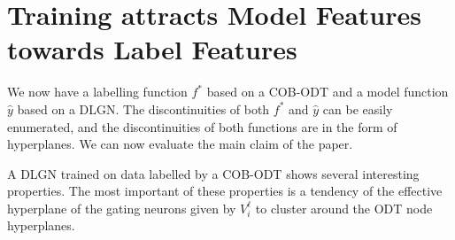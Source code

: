 \documentclass{article} %
\renewcommand{\>}{{\rightarrow}}
\renewcommand{\=}{\stackrel{\triangle}{=}}
\newcommand{\0}{{\mathbf 0}}
\begin{document}

\section{Training attracts Model Features towards Label Features}
\label{sec:Model-feats-label-feats}
We now have a labelling function $f^*$ based on a COB-ODT and a model function $\widehat y$ based on a DLGN. The discontinuities of both $f^*$ and $\widehat y$ can be easily enumerated, and the discontinuities of both functions are in the form of hyperplanes. We can now evaluate the main claim of the paper.

A DLGN trained on data labelled by a COB-ODT shows several interesting properties. The most important of these properties is a tendency of the effective hyperplane of the gating neurons given by $V^\ell_i$ to cluster around the ODT node hyperplanes.
\end{document}
